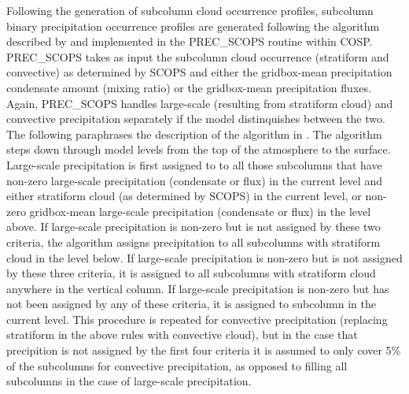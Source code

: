 Following the generation of subcolumn cloud occurrence profiles, subcolumn binary precipitation occurrence profiles are generated following the algorithm described by \cite{zhang_et_al_2010} and implemented in the PREC\_SCOPS routine within COSP. PREC\_SCOPS takes as input the subcolumn cloud occurrence (stratiform and convective) as determined by SCOPS and either the gridbox-mean precipitation condensate amount (mixing ratio) or the gridbox-mean precipitation fluxes. Again, PREC\_SCOPS handles large-scale (resulting from stratiform cloud) and convective precipitation separately if the model distinquishes between the two. The following paraphrases the description of the algorithm in \cite{zhang_et_al_2010}. The algorithm steps down through model levels from the top of the atmosphere to the surface. Large-scale precipitation is first assigned to to all those subcolumns that have non-zero large-scale precipitation (condensate or flux) in the current level and either stratiform cloud (as determined by SCOPS) in the current level, or non-zero gridbox-mean large-scale precipitation (condensate or flux) in the level above. If large-scale precipitation is non-zero but is not assigned by these two criteria, the algorithm assigns precipitation to all subcolumns with stratiform cloud in the level below. If large-scale precipitation is non-zero but is not assigned by these three criteria, it is assigned to all subcolumns with stratiform cloud anywhere in the vertical column. If large-scale precipitation is non-zero but has not been assigned by any of these criteria, it is assigned to subcolumn in the current level. This procedure is repeated for convective precipitation (replacing stratiform in the above rules with convective cloud), but in the case that precipition is not assigned by the first four criteria it is assumed to only cover 5\% of the subcolumns for convective precipitation, as opposed to filling all subcolumns in the case of large-scale precipitation.

